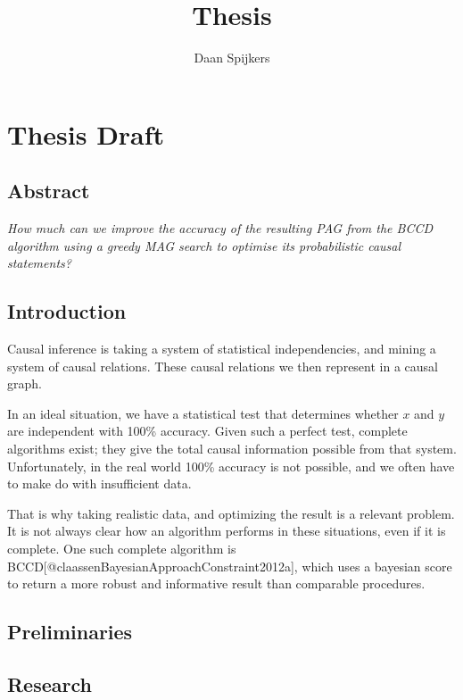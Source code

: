 \documentclass[
]{article}
\title{Thesis}
\author{Daan Spijkers}
\date{}
\begin{document}
\maketitle

\hypertarget{thesis-draft}{%
\section{Thesis Draft}\label{thesis-draft}}

\hypertarget{abstract}{%
\subsection{Abstract}\label{abstract}}

\emph{How much can we improve the accuracy of the resulting PAG from the
BCCD algorithm using a greedy MAG search to optimise its probabilistic
causal statements?}

\hypertarget{introduction}{%
\subsection{Introduction}\label{introduction}}

Causal inference is taking a system of statistical independencies, and
mining a system of causal relations. These causal relations we then
represent in a causal graph.

In an ideal situation, we have a statistical test that determines
whether \(x\) and \(y\) are independent with 100\% accuracy. Given such
a perfect test, complete algorithms exist; they give the total causal
information possible from that system. Unfortunately, in the real world
100\% accuracy is not possible, and we often have to make do with
insufficient data.

That is why taking realistic data, and optimizing the result is a
relevant problem. It is not always clear how an algorithm performs in
these situations, even if it is complete. One such complete algorithm is
BCCD{[}@claassenBayesianApproachConstraint2012a{]}, which uses a
bayesian score to return a more robust and informative result than
comparable procedures.

\hypertarget{preliminaries}{%
\subsection{Preliminaries}\label{preliminaries}}

\hypertarget{research}{%
\subsection{Research}\label{research}}
\end{document}
